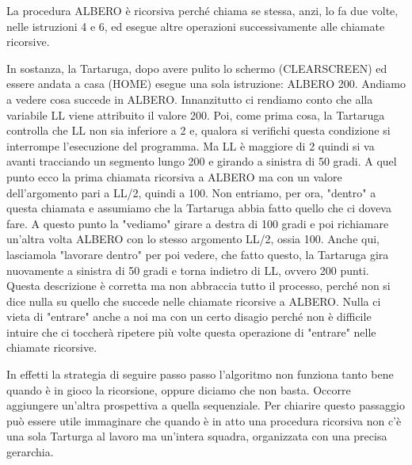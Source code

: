 \vskip 1cm

La procedura ALBERO è ricorsiva perché chiama se stessa, anzi, lo fa due volte, nelle istruzioni 4 e 6, ed esegue altre operazioni successivamente alle chiamate ricorsive.

In sostanza, la Tartaruga, dopo avere pulito lo schermo (CLEARSCREEN) ed essere andata a casa (HOME) esegue una sola istruzione: ALBERO 200. Andiamo a vedere cosa succede in ALBERO. Innanzitutto ci rendiamo conto che alla variabile LL viene attribuito il valore 200. Poi, come prima cosa, la Tartaruga controlla che LL non sia inferiore a 2 e, qualora si verifichi questa condizione si interrompe l'esecuzione del programma. Ma LL è maggiore di 2 quindi si va avanti tracciando un segmento lungo 200 e girando a sinistra di 50 gradi. A quel punto ecco la prima chiamata ricorsiva a ALBERO ma con un valore dell'argomento pari a LL/2, quindi a 100. Non entriamo, per ora, "dentro" a questa chiamata e assumiamo che la Tartaruga abbia fatto quello che ci doveva fare. A questo punto la "vediamo" girare a destra di 100 gradi e poi richiamare un'altra volta ALBERO con lo stesso argomento LL/2, ossia 100. Anche qui, lasciamola "lavorare dentro" per poi vedere, che fatto questo, la Tartaruga gira nuovamente a sinistra di 50 gradi e torna indietro di LL, ovvero 200 punti. Questa descrizione è corretta ma non abbraccia tutto il processo, perché non si dice nulla su quello che succede nelle chiamate ricorsive a ALBERO. Nulla ci vieta di "entrare" anche a noi ma con un certo disagio perché non è difficile intuire che ci toccherà ripetere più volte questa operazione di "entrare" nelle chiamate ricorsive. 

In effetti la strategia di seguire passo passo l'algoritmo non funziona tanto bene quando è in gioco la ricorsione, oppure diciamo che non basta. Occorre aggiungere un'altra prospettiva a quella sequenziale. Per chiarire questo passaggio può essere utile immaginare che quando è in atto una procedura ricorsiva non c'è una sola Tarturga al lavoro ma un'intera squadra, organizzata con una precisa gerarchia.   

